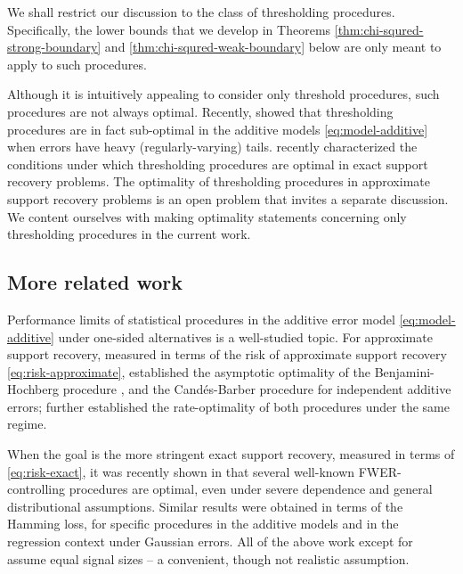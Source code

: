 We shall restrict our discussion to the class of thresholding procedures.
Specifically, the lower bounds that we develop in Theorems \ref{thm:chi-squred-strong-boundary} and \ref{thm:chi-squred-weak-boundary} below are only meant to apply to such procedures.

\begin{remark}
Although it is intuitively appealing to consider only threshold procedures, such procedures are not always optimal.
Recently, \citet{chen2018scan} showed that thresholding procedures are in fact sub-optimal in the additive models \eqref{eq:model-additive} when errors have heavy (regularly-varying) tails. 
\citet{gao2018fundamental} recently characterized the conditions under which thresholding procedures are optimal in exact support recovery problems.
The optimality of thresholding procedures in approximate support recovery problems is an open problem that invites a separate discussion. 
We content ourselves with making optimality statements concerning only thresholding procedures in the current work.
\end{remark}


\subsection{More related work}

Performance limits of statistical procedures in the additive error model \eqref{eq:model-additive} under one-sided alternatives is a well-studied topic.
For approximate support recovery, measured in terms of the risk of approximate support recovery \eqref{eq:risk-approximate}, \citet*{arias2017distribution} established the asymptotic optimality of the Benjamini-Hochberg procedure \cite{benjamini1995controlling}, and the Cand\'es-Barber procedure \cite{barber2015controlling} for independent additive errors;
\citet{rabinovich2017optimal} further established the rate-optimality of both procedures under the same regime.

When the goal is the more stringent exact support recovery, measured in terms of \eqref{eq:risk-exact}, it was recently shown in \cite{gao2018fundamental} that several well-known FWER-controlling procedures are optimal, even under severe dependence and general distributional assumptions.
Similar results were obtained in terms of the Hamming loss, for specific procedures in the additive models \cite{butucea2018variable} and in the regression context \cite{ji2012ups,jin2014optimality} under Gaussian errors.
All of the above work except for \cite{gao2018fundamental} assume equal signal sizes -- a convenient, though not realistic assumption.


